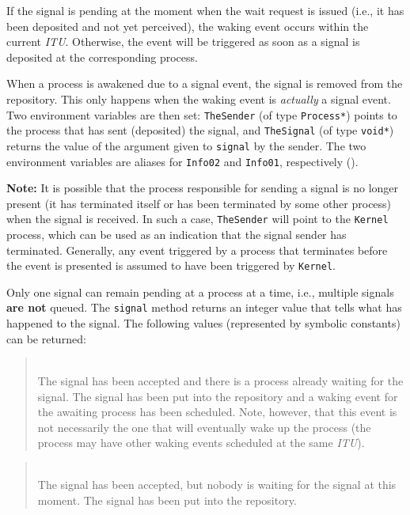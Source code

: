 If the signal is pending at the moment when the wait request
is issued (i.e., it has been deposited and not yet perceived),
the waking event occurs within the current {\em ITU}.
Otherwise, the event will be triggered as soon as a signal is deposited
at the corresponding process.

When a process is awakened due to a signal event, the signal is removed
from the repository.
This only happens when the waking event is {\em actually\/} a signal event.
Two environment variables are then set:
{\tt TheSender} (of type {\tt Process*}) points to the process that has sent
(deposited) the signal, and {\tt TheSignal} (of type {\tt void*}) returns
the value of the argument given to {\tt signal} by the sender.
The two environment variables are aliases for {\tt Info02} and
{\tt Info01}, respectively ().

\medskip

\noindent
{\bf Note:}
It is possible that the process responsible for sending a signal is no longer
present (it has terminated itself or has been terminated by some other
process) when the signal is received.
In such a case, {\tt TheSender} will point to the {\tt Kernel} process,
which can be used as an indication that the signal sender has terminated.
Generally, any event triggered by a process that terminates before the event
is presented is assumed to have been triggered by {\tt Kernel}.

\medskip

Only one signal can remain pending at a process at a time, i.e., multiple
signals {\bf are not} queued.
The {\tt signal} method returns an integer value that tells what has happened
to the signal.
The following values (represented by symbolic constants) can be
returned:

\medskip

\begin{quote}
\noindent{}\\ \hspace{0in}
The signal has been accepted and there is a process already
waiting for the signal.
The signal has been put into the repository and a waking event for the
awaiting process has been scheduled.
Note, however,
that this event is not necessarily the one that will eventually wake up
the process (the process may have other waking events scheduled at the
same {\em ITU\/}).
\end{quote}

\begin{quote}
\noindent{}\\ \hspace{0in}
The signal has been accepted, but nobody is waiting for the signal at this
moment.
The signal has been put into the repository.
\end{quote}

